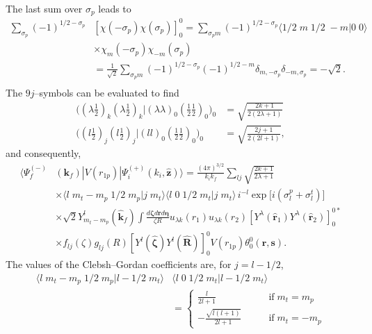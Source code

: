 The last sum over $\sigma_p$ leads to
\begin{equation}\label{eq99}
  \begin{split}
  \sum_{\sigma_p}(-1)^{1/2-\sigma_p}&\left[\chi(-\sigma_p)\chi(\sigma_p)\right]^{0}_{0}=
  \sum_{\sigma_p m}(-1)^{1/2-\sigma_p}\langle 1/2 \;m\;1/2\;-m|0\;0\rangle\\
  &\times \chi_m(-\sigma_p)\chi_{-m}(\sigma_p)\\
  &=\frac{1}{\sqrt 2}\sum_{\sigma_p m}(-1)^{1/2-\sigma_p}(-1)^{1/2-m}
   \delta_{m,-\sigma_p}\delta_{-m,\sigma_p}=-\sqrt 2.\\
  \end{split}
\end{equation}
The $9j$--symbols can be evaluated to find
\begin{equation}\label{eq100}
  \begin{split}
\bigl((\lambda \tfrac{1}{2})_k(\lambda \tfrac{1}{2})_k|(\lambda \lambda)_0(\tfrac{1}{2}\tfrac{1}{2})_0\bigr)_0&=\sqrt{\frac{2k+1}{2(2\lambda+1)}}\\
\bigl((l \tfrac{1}{2})_{j}(l \tfrac{1}{2})_{j}|(l l)_0(\tfrac{1}{2}\tfrac{1}{2})_0\bigr)_0
&=\sqrt{\frac{2j+1}{2(2l+1)}},
  \end{split}
\end{equation}
and consequently,
\begin{equation}\label{eq101}
  \begin{split}
  \langle \Psi_f^{(-)}&(\mathbf{k}_f)|V(r_{1p})|\Psi_i^{(+)}(k_i,\hat {\mathbf{z}})\rangle=\frac{(4\pi)^{3/2}}{k_ik_f}\sum_{lj}\sqrt{\frac{2k+1}{2\lambda+1}}\\
  &\times \langle l \;m_t-m_p\;1/2\;m_p|j\;m_t\rangle\langle l \;0\;1/2\;m_t|j\;m_t\rangle\,i^{-l}\exp\bigl[i(\sigma_{l}^p+\sigma_{l}^t)\bigr]\\
  &\times \sqrt 2 Y_{m_t-m_p}^{l}(\hat{\mathbf{k}}_f) \int \frac {d\boldsymbol{\zeta}d\mathbf{r}d\boldsymbol{\eta}}{\zeta R} u_{\lambda k}(r_1)u_{\lambda k}(r_2)\left[Y^{\lambda}(\hat{\mathbf{r}}_1)Y^{\lambda}(\hat{\mathbf{r}}_2)\right]^{0*}_{0}\\
  &\times f_{lj}(\zeta)g_{lj}(R)\left[Y^{l}(\hat{\boldsymbol{\zeta}})Y^{l}(\hat{\mathbf{R}})\right]^{0}_{0} V(r_{1p}) \theta_0^0(\mathbf{r},\mathbf{s}).
  \end{split}
\end{equation}
The  values of the Clebsh--Gordan coefficients are, for $j=l-1/2$,
 \begin{equation}\label{eq7_2_17}
 \begin{split}
\langle l \;m_t-m_p\;1/2\;m_p|l-1/2\;m_t\rangle & \langle l \;0\;1/2\;m_t|l-1/2\;m_t\rangle\\
&=\left\{
\begin{aligned}
\frac{l}{2l+1} \qquad &\text{if}\; m_t=m_p\\
-\frac{\sqrt{l(l+1)}}{2l+1}\qquad &\text{if} \;m_t=-m_p
\end{aligned}
\right.
\end{split}
\end{equation}
